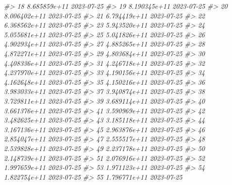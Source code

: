 \documentclass[
  xelatex, ja=standard]{bxjsbook}
\newenvironment{Shaded}{\begin{snugshade}}{\end{snugshade}}
\newcommand{\CommentTok}[1]{\textcolor[rgb]{0.56,0.35,0.01}{\textit{#1}}}
\theoremstyle{definition}
\theoremstyle{definition}
\theoremstyle{definition}
\theoremstyle{definition}
\theoremstyle{remark}
\begin{document}
\begin{Shaded}
\begin{Highlighting}[]
\CommentTok{\#\textgreater{} 18  8.685859e+11         2023{-}07{-}25}
\CommentTok{\#\textgreater{} 19  8.190345e+11         2023{-}07{-}25}
\CommentTok{\#\textgreater{} 20  8.006402e+11         2023{-}07{-}25}
\CommentTok{\#\textgreater{} 21  6.794419e+11         2023{-}07{-}25}
\CommentTok{\#\textgreater{} 22  6.368562e+11         2023{-}07{-}25}
\CommentTok{\#\textgreater{} 23  5.943520e+11         2023{-}07{-}25}
\CommentTok{\#\textgreater{} 24  5.055681e+11         2023{-}07{-}25}
\CommentTok{\#\textgreater{} 25  5.041826e+11         2023{-}07{-}25}
\CommentTok{\#\textgreater{} 26  4.902934e+11         2023{-}07{-}25}
\CommentTok{\#\textgreater{} 27  4.885265e+11         2023{-}07{-}25}
\CommentTok{\#\textgreater{} 28  4.872271e+11         2023{-}07{-}25}
\CommentTok{\#\textgreater{} 29  4.803684e+11         2023{-}07{-}25}
\CommentTok{\#\textgreater{} 30  4.408336e+11         2023{-}07{-}25}
\CommentTok{\#\textgreater{} 31  4.246718e+11         2023{-}07{-}25}
\CommentTok{\#\textgreater{} 32  4.237970e+11         2023{-}07{-}25}
\CommentTok{\#\textgreater{} 33  4.190156e+11         2023{-}07{-}25}
\CommentTok{\#\textgreater{} 34  4.162648e+11         2023{-}07{-}25}
\CommentTok{\#\textgreater{} 35  4.150216e+11         2023{-}07{-}25}
\CommentTok{\#\textgreater{} 36  3.983033e+11         2023{-}07{-}25}
\CommentTok{\#\textgreater{} 37  3.940874e+11         2023{-}07{-}25}
\CommentTok{\#\textgreater{} 38  3.729811e+11         2023{-}07{-}25}
\CommentTok{\#\textgreater{} 39  3.689114e+11         2023{-}07{-}25}
\CommentTok{\#\textgreater{} 40  3.661376e+11         2023{-}07{-}25}
\CommentTok{\#\textgreater{} 41  3.590969e+11         2023{-}07{-}25}
\CommentTok{\#\textgreater{} 42  3.482625e+11         2023{-}07{-}25}
\CommentTok{\#\textgreater{} 43  3.185118e+11         2023{-}07{-}25}
\CommentTok{\#\textgreater{} 44  3.167136e+11         2023{-}07{-}25}
\CommentTok{\#\textgreater{} 45  2.963876e+11         2023{-}07{-}25}
\CommentTok{\#\textgreater{} 46  2.854047e+11         2023{-}07{-}25}
\CommentTok{\#\textgreater{} 47  2.555517e+11         2023{-}07{-}25}
\CommentTok{\#\textgreater{} 48  2.539828e+11         2023{-}07{-}25}
\CommentTok{\#\textgreater{} 49  2.237178e+11         2023{-}07{-}25}
\CommentTok{\#\textgreater{} 50  2.148739e+11         2023{-}07{-}25}
\CommentTok{\#\textgreater{} 51  2.076916e+11         2023{-}07{-}25}
\CommentTok{\#\textgreater{} 52  1.997659e+11         2023{-}07{-}25}
\CommentTok{\#\textgreater{} 53  1.971123e+11         2023{-}07{-}25}
\CommentTok{\#\textgreater{} 54  1.822754e+11         2023{-}07{-}25}
\CommentTok{\#\textgreater{} 55  1.796771e+11         2023{-}07{-}25}

\end{Highlighting}
\end{Shaded}
\end{document}
